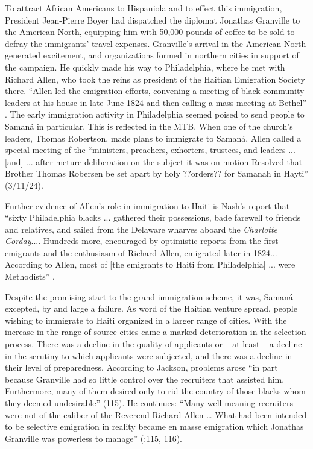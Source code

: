 \documentclass[output=paper,colorlinks,citecolor=brown]{langscibook}
\begin{document}
To attract African Americans to Hispaniola and to effect this immigration, President Jean-Pierre Boyer had dispatched the diplomat Jonathas Granville to the American North, equipping him with 50,000 pounds of coffee to be sold to defray the immigrants’ travel expenses. Granville’s arrival in the American North generated excitement, and organizations formed in northern cities in support of the campaign.  He quickly made his way to Philadelphia, where he met with Richard Allen, who took the reins as president of the Haitian Emigration Society there. “Allen led the emigration efforts, convening a meeting of black community leaders at his house in late June 1824 and then calling a mass meeting at Bethel” \citep[242]{Nash1988}. The early immigration activity in Philadelphia seemed poised to send people to Samaná in particular. This is reflected in the MTB.  When one of the church’s leaders, Thomas Robertson, made plans to immigrate to Samaná, Allen called a special meeting of the “ministers, preachers, exhorters, trustees, and leaders ... [and] ... after meture deliberation on the subject it was on motion Resolved that Brother Thomas Robersen be set apart by holy ??orders?? for Samanah in Hayti” (3/11/24).  

 
Further evidence of Allen’s role in immigration to Haiti is Nash’s report that  “sixty Philadelphia blacks ... gathered their possessions, bade farewell to friends and relatives, and sailed from the Delaware wharves aboard the \textit{Charlotte Corday}...{.} Hundreds more, encouraged by optimistic reports from the first emigrants and the enthusiasm of Richard Allen, emigrated later in 1824... According to Allen, most of [the emigrants to Haiti from Philadelphia] ...  were Methodists” \citep[244]{Nash1988}.
 

Despite the promising start to the grand immigration scheme, it was, Samaná excepted, by and large a failure. As word of the Haitian venture spread, people wishing to immigrate to Haiti organized in a larger range of cities. With the increase in the range of source cities came a marked deterioration in the selection process. There was a decline in the quality of applicants or – at least – a decline in the scrutiny to which applicants were subjected, and there was a decline in their level of preparedness. According to Jackson, problems arose “in part because Granville had so little control over the recruiters that assisted him. Furthermore, many of them desired only to rid the country of those blacks whom they deemed undesirable” (115). He continues: “Many well-meaning recruiters were not of the caliber of the Reverend Richard Allen … What had been intended to be selective emigration in reality became en masse emigration which Jonathas Granville was powerless to manage” (\citealt{Jackson1976}:115, 116). 
 
\end{document}
